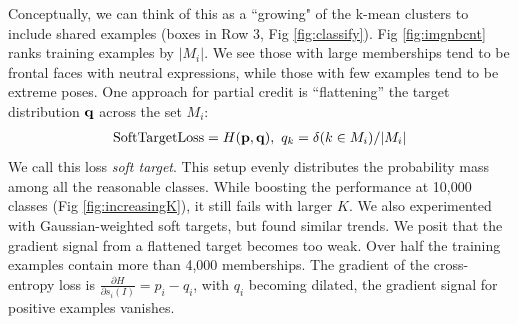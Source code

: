 \documentclass[letterpaper]{article} %
\newcommand{\ie}{\textit{i.e.}}
\begin{document}
Conceptually, we can think of this as a ``growing" of the k-mean clusters to include shared examples (boxes in Row 3, Fig \ref{fig:classify}). Fig \ref{fig:imgnbcnt} ranks training examples by $|M_i|$. We see those with large memberships tend to be frontal faces with neutral expressions, while those with few examples tend to be extreme poses.
One approach for partial credit is ``flattening'' the target distribution ${\bf q}$ across the set $M_i$:
\begin{align}
\label{eq:softtarget}
\text{SoftTargetLoss} = H({\bf p}, {\bf q}), \ q_k =  \delta(k \in M_i)/|M_i|
\end{align}
We call this loss {\em soft target}. This setup evenly distributes the probability mass among all the reasonable classes. While boosting the performance at 10,000 classes (Fig \ref{fig:increasingK}), it still fails with larger $K$. We also experimented with Gaussian-weighted soft targets, but found similar trends. We posit that the gradient signal from a flattened target becomes too weak. Over half the training examples contain more than 4,000 memberships. The gradient of the cross-entropy loss is $\frac{\partial H}{\partial s_i(I)} = p_i - q_i$, with $q_i$ becoming dilated, the gradient signal for positive examples vanishes.
\end{document}
